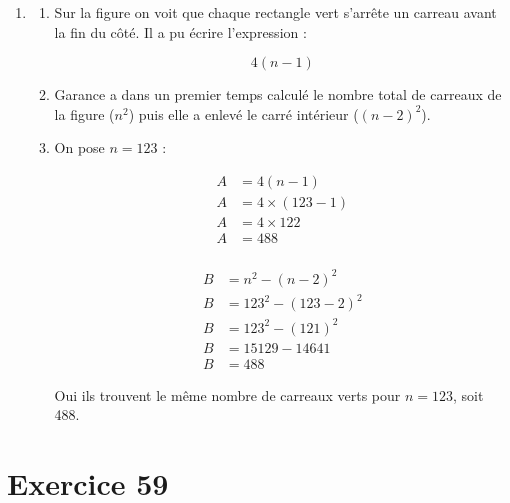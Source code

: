 \documentclass[12pt,a4paper]{article}
\begin{document}
\begin{enumerate}[label={\arabic*)}]
	
	\item \begin{enumerate}[label={\alph*)}]
		\item Sur la figure on voit que chaque rectangle vert s'arrête un carreau avant la fin du côté. Il a pu écrire l'expression :
		
		\begin{equation*}
			4(n-1)
		\end{equation*}
	
		\item Garance a dans un premier temps calculé le nombre total de carreaux de la figure ($n^2$) puis elle a enlevé le carré intérieur ($(n-2)^2$).
		
		\item On pose $n=123$ :
		
		\begin{multicols}{2}
			\begin{align*}
				A &= 4(n-1) \\
				A &= 4 \times (123 - 1)\\
				A &= 4 \times 122 \\
				A &= 488 \\
			\end{align*}
			
			\begin{align*}
				B &= n^2 - (n-2)^2 \\
				B &= 123^2 - (123-2)^2 \\
				B &= 123^2 - (121)^2 \\
				B &= \num{15129} - \num{14641} \\
				B &= 488
			\end{align*}
		\end{multicols}

		Oui ils trouvent le même nombre de carreaux verts pour $n=123$, soit 488.
	\end{enumerate}	
\end{enumerate}

\newpage

\section*{Exercice 59}
\end{document}

